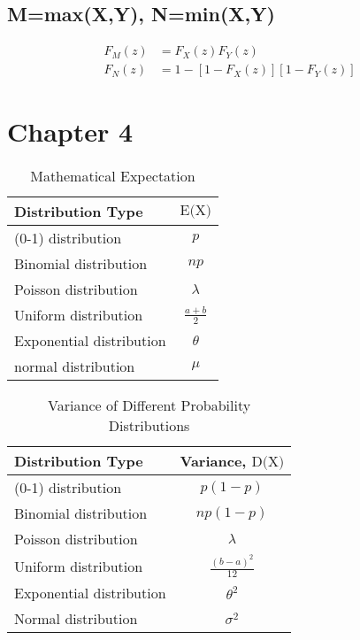 \documentclass[12pt]{article}
\begin{document}
\subsection{M=max(X,Y), N=min(X,Y)}

\begin{align}
    F_M(z) &= F_X(z)F_Y(z)\\
    F_N(z) &= 1-[1-F_X(z)][1-F_Y(z)]
\end{align}

\section{Chapter 4}

\begin{table}[h]
    \centering
    \caption{Mathematical Expectation}
    \renewcommand{\arraystretch}{1.5}
    \begin{tabular}{p{}c} 
      \toprule
      \textbf{Distribution Type}  & \textbf{$\text{E(X)}$} \\
      \midrule
      (0-1) distribution & $p$ \\
      Binomial distribution & $np$ \\
      Poisson distribution & $\lambda$ \\
      Uniform distribution & $\frac{a+b}{2}$ \\
      Exponential distribution & $\theta$ \\
      normal distribution & $\mu$ \\
      \bottomrule
    \end{tabular}
\end{table}

\begin{table}[h!]
    \centering
    \caption{Variance of Different Probability Distributions}
    \renewcommand{\arraystretch}{1.5}
    \begin{tabular}{p{}c} 
      \toprule
      \textbf{Distribution Type}  & \textbf{Variance, $\text{D(X)}$} \\
      \midrule
      (0-1) distribution & $p(1-p)$ \\
      Binomial distribution & $np(1-p)$ \\
      Poisson distribution & $\lambda$ \\
      Uniform distribution & $\frac{(b-a)^2}{12}$ \\
      Exponential distribution & $\theta^2$ \\
      Normal distribution & $\sigma^2$ \\
      \bottomrule
    \end{tabular}
\end{table}
\end{document}
